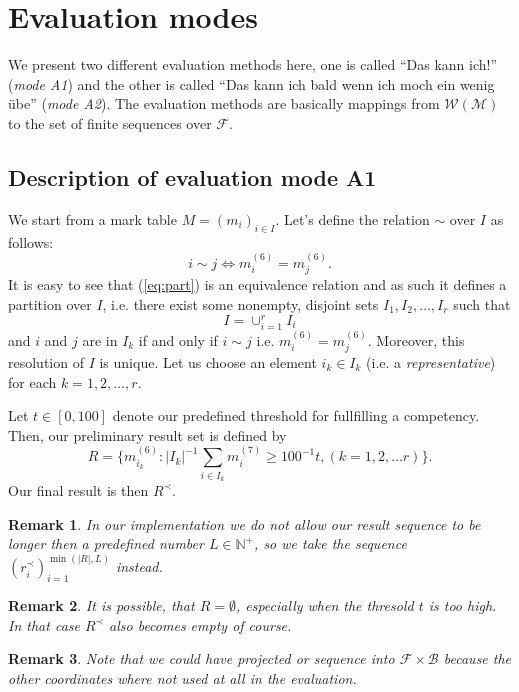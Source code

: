 \documentclass{scrartcl}
\newtheorem{remark}{Remark}
\begin{document}
\section{Evaluation modes}
We present two different evaluation methods here, one is called ``Das kann ich!'' (\emph{mode A1}) and the other is called ``Das kann ich bald wenn ich moch ein wenig übe'' (\emph{mode A2}). The evaluation methods are basically mappings from $\mathcal{W}({\mathcal{M}})$ to the set of finite sequences over $\mathcal{F}$.

\subsection{Description of evaluation mode A1}
We start from a mark table $M=(m_i)_{i\in I}$. Let's define the relation $\sim$ over $I$ as follows:
\begin{equation}
i\sim j \Leftrightarrow m_i^{(6)}=m_j^{(6)}.
\label{eq:part}
\end{equation}
It is easy to see that (\ref{eq:part}) is an equivalence relation and as such it defines a partition over $I$, i.e. there exist some nonempty, disjoint sets $I_1,I_2,\ldots,I_r$ such that $$I=\cup_{i=1}^r I_i$$ and $i$ and $j$ are in $I_k$ if and only if $i\sim j$ i.e. $m_i^{(6)}=m_j^{(6)}$. Moreover, this resolution of $I$ is unique. Let us choose an element $i_k\in I_k$ (i.e. a \emph{representative}) for each $k=1,2,\ldots,r$.

Let $t\in [0,100]$ denote our predefined threshold for fullfilling a competency. Then, our preliminary result set is defined by 
$$R=\{m_{i_k}^{(6)}: |I_k|^{-1}\sum_{i \in I_k}m_{i}^{(7)}\geq 100^{-1}t, (k=1,2,\ldots r)\}.$$
Our final result is then $R^{\prec}$.
\begin{remark}
In our implementation we do not allow our result sequence to be longer then a predefined number $L\in\mathbb{N}^+$, so we take the sequence $(r^{\prec}_i)_{i=1}^{\min(|R|,L)}$ instead.    
\end{remark}

\begin{remark}
It is possible, that $R=\emptyset$, especially when the thresold $t$ is too high. In that case $R^{\prec}$ also becomes empty of course.
\end{remark}

\begin{remark}
Note that we could have projected or sequence into $\mathcal{F}\times\mathcal{B}$ because the other coordinates where not used at all in the evaluation.
\end{remark}
\end{document}

